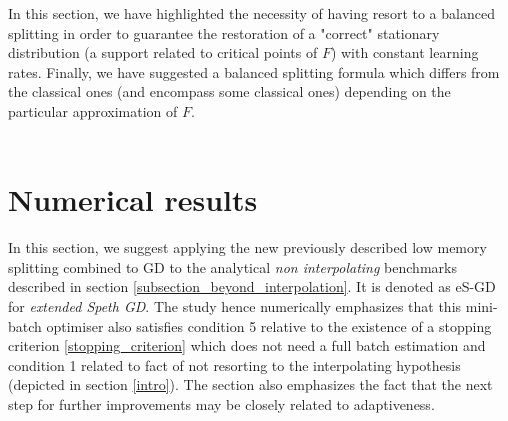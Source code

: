 \documentclass[article,authoryear,jmlmc]{beg_32}             %
\begin{document}
In this section, we have highlighted the necessity of having resort to a balanced splitting in order to guarantee the restoration of a "correct" stationary distribution (a support related to critical
points of $F$) with constant learning rates. Finally, we have suggested a balanced splitting formula which differs from the classical ones (and encompass some classical ones) %
depending on the particular approximation of $F$. 
\ \\ \ \\

\section{Numerical results}
\label{num_res}


In this section, we suggest applying the new previously described {low memory} splitting combined to GD to the 
analytical {\em non interpolating} benchmarks described in section \ref{subsection_beyond_interpolation}. 
It is denoted as {eS-GD} for {\em extended Speth GD}.
The study hence numerically emphasizes that this mini-batch optimiser also
satisfies condition 5 relative to the existence of a stopping criterion \eqref{stopping_criterion} which does not need a full batch estimation and condition 1 related to fact of
not resorting to the interpolating hypothesis (depicted in section \ref{intro}). 
The section also emphasizes the fact that the next step for further improvements may be closely related to adaptiveness. 


\end{document}
